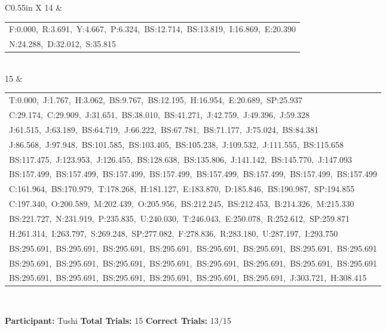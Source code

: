\documentclass[10pt,a4paper]{article}
\begin{document}
\begin{center}
\begin{tabularx}{\textwidth}{
    C{0.55in}
    X
}
14 &
\begin{tabular}[t]{@{}l@{}}
F:0.000,\ R:3.691,\ Y:4.667,\ P:6.324,\ BS:12.714,\ BS:13.819,\ I:16.869,\ E:20.390\\
N:24.288,\ D:32.012,\ S:35.815
\end{tabular}
\\[0.12cm]

15 &
\begin{tabular}[t]{@{}l@{}}
T:0.000,\ J:1.767,\ H:3.062,\ BS:9.767,\ BS:12.195,\ H:16.954,\ E:20.689,\ SP:25.937\\
C:29.174,\ C:29.909,\ J:31.651,\ BS:38.010,\ BS:41.271,\ J:42.759,\ J:49.396,\ J:59.328\\
J:61.515,\ J:63.189,\ BS:64.719,\ J:66.222,\ BS:67.781,\ BS:71.177,\ J:75.024,\ BS:84.381\\
J:86.568,\ J:97.948,\ BS:101.585,\ BS:103.405,\ BS:105.238,\ J:109.532,\ J:111.555,\ BS:115.658\\
BS:117.475,\ J:123.953,\ J:126.455,\ BS:128.638,\ BS:135.806,\ J:141.142,\ BS:145.770,\ J:147.093\\
BS:157.499,\ BS:157.499,\ BS:157.499,\ BS:157.499,\ BS:157.499,\ BS:157.499,\ BS:157.499,\ BS:157.499\\
C:161.964,\ BS:170.979,\ T:178.268,\ H:181.127,\ E:183.870,\ D:185.846,\ BS:190.987,\ SP:194.855\\
C:197.340,\ O:200.589,\ M:202.439,\ O:205.956,\ BS:212.245,\ BS:212.453,\ B:214.326,\ M:215.330\\
BS:221.727,\ N:231.919,\ P:235.835,\ U:240.030,\ T:246.043,\ E:250.078,\ R:252.612,\ SP:259.871\\
H:261.314,\ I:263.797,\ S:269.248,\ SP:277.082,\ F:278.836,\ R:283.180,\ U:287.197,\ I:293.750\\
BS:295.691,\ BS:295.691,\ BS:295.691,\ BS:295.691,\ BS:295.691,\ BS:295.691,\ BS:295.691,\ BS:295.691\\
BS:295.691,\ BS:295.691,\ BS:295.691,\ BS:295.691,\ BS:295.691,\ BS:295.691,\ BS:295.691,\ BS:295.691\\
BS:295.691,\ BS:295.691,\ BS:295.691,\ BS:295.691,\ BS:295.691,\ BS:295.691,\ J:303.721,\ H:308.415
\end{tabular}
\\[0.12cm]

\bottomrule
\end{tabularx}
\end{center}

\vfill


\noindent
\textbf{Participant:} Tushi
\hfill
\textbf{Total Trials:} 15
\hfill
\textbf{Correct Trials:} 13/15
\end{document}
